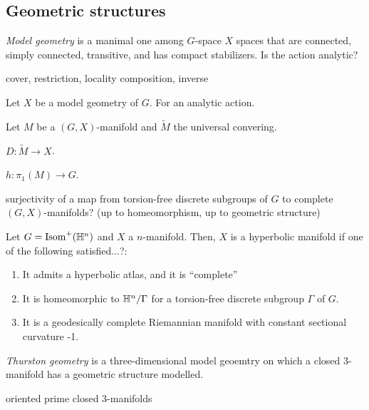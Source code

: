 \documentclass[12pt]{article}
\begin{document}
\subsection{Geometric structures}



\emph{Model geometry} is a manimal one among $G$-space $X$ spaces that are connected, simply connected, transitive, and has compact stabilizers.
Is the action analytic?

\begin{defn}[Pseudogroup]
cover, restriction, locality
composition, inverse
\end{defn}
\begin{defn}[$(G,X)$-structure]
Let $X$ be a model geometry of $G$.
For an analytic action.
\end{defn}
\begin{defn}
Let $M$ be a $(G,X)$-manifold and $\tilde M$ the universal convering.
\begin{parts}
\item $D:\tilde M\to X$.
\item $h:\pi_1(M)\to G$.
\end{parts}
\end{defn}

surjectivity of a map from torsion-free discrete subgroups of $G$ to complete $(G,X)$-manifolds?
(up to homeomorphism, up to geometric structure)




\begin{defn}
Let $G=\operatorname{Isom}^+(\mathbb{H}^n)$ and $X$ a $n$-manifold.
Then, $X$ is a hyperbolic manifold if one of the following satisfied...?:
\begin{enumerate}
\item It admits a hyperbolic atlas, and it is ``complete''
\item It is homeomorphic to $\mathbb{H}^n/\Gamma$ for a torsion-free discrete subgroup $\Gamma$ of $G$.
\item It is a geodesically complete Riemannian manifold with constant sectional curvature -1.
\end{enumerate}
\end{defn}





\emph{Thurston geometry} is a three-dimensional model geoemtry on which a closed 3-manifold has a geometric structure modelled.

oriented prime closed 3-manifolds
\end{document}

